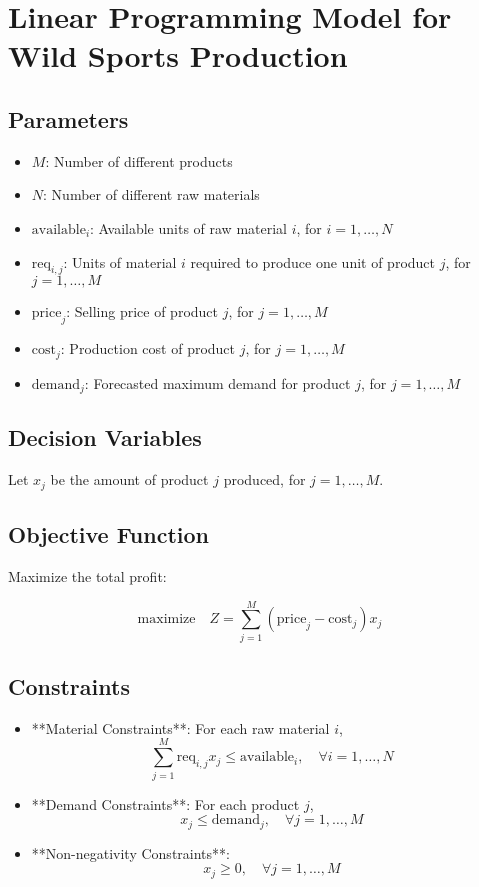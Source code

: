 \documentclass{article}
\begin{document}
\section*{Linear Programming Model for Wild Sports Production}

\subsection*{Parameters}

\begin{itemize}
    \item \( M \): Number of different products
    \item \( N \): Number of different raw materials
    \item \( \text{available}_{i} \): Available units of raw material \( i \), for \( i = 1, \ldots, N \)
    \item \( \text{req}_{i,j} \): Units of material \( i \) required to produce one unit of product \( j \), for \( j = 1, \ldots, M \)
    \item \( \text{price}_{j} \): Selling price of product \( j \), for \( j = 1, \ldots, M \)
    \item \( \text{cost}_{j} \): Production cost of product \( j \), for \( j = 1, \ldots, M \)
    \item \( \text{demand}_{j} \): Forecasted maximum demand for product \( j \), for \( j = 1, \ldots, M \)
\end{itemize}

\subsection*{Decision Variables}
Let \( x_{j} \) be the amount of product \( j \) produced, for \( j = 1, \ldots, M \).

\subsection*{Objective Function}

Maximize the total profit:

\[
\text{maximize} \quad Z = \sum_{j=1}^{M} ( \text{price}_{j} - \text{cost}_{j} ) x_{j}
\]

\subsection*{Constraints}

\begin{itemize}
    \item **Material Constraints**: For each raw material \( i \),
    \[
    \sum_{j=1}^{M} \text{req}_{i,j} x_{j} \leq \text{available}_{i}, \quad \forall i=1,\ldots,N
    \]

    \item **Demand Constraints**: For each product \( j \),
    \[
    x_{j} \leq \text{demand}_{j}, \quad \forall j=1,\ldots,M
    \]

    \item **Non-negativity Constraints**:
    \[
    x_{j} \geq 0, \quad \forall j=1,\ldots,M
    \]
\end{itemize}
\end{document}
